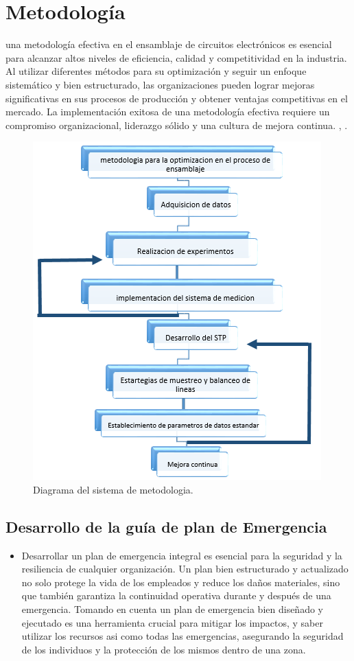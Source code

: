     \section{ Metodología }
    una metodología efectiva en el ensamblaje de circuitos electrónicos es esencial para alcanzar altos niveles de eficiencia, calidad y competitividad en la industria. Al utilizar diferentes métodos para su optimización y seguir un enfoque sistemático y bien estructurado, las organizaciones pueden lograr mejoras significativas en sus procesos de producción y obtener ventajas competitivas en el mercado. La implementación exitosa de una metodología efectiva requiere un compromiso organizacional, liderazgo sólido y una cultura de mejora continua.
    \cite{Groover}, \cite{Niebel}.
    \begin{figure}[H]
        \centering
    \includegraphics[scale=0.50]{1/img/Diagrama del sistema de metodologia.png}
        \caption{Diagrama del sistema de metodologia.}
    \end{figure}
    \subsection{Desarrollo de la guía de plan de Emergencia}
    \begin{itemize}
    \item Desarrollar un plan de emergencia integral es esencial para la seguridad y la resiliencia de cualquier organización. Un plan bien estructurado y actualizado no solo protege la vida de los empleados y reduce los daños materiales, sino que también garantiza la continuidad operativa durante y después de una emergencia.
    Tomando en cuenta un plan de emergencia bien diseñado y ejecutado es una herramienta crucial para mitigar los impactos, y saber utilizar los recursos asi como todas las emergencias, asegurando la seguridad de los individuos y la protección de los mismos dentro de una zona.
    \end{itemize}
